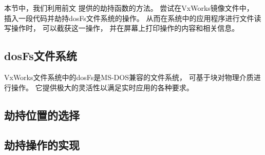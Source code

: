 本节中，我们利用前文
提供的劫持函数的方法。
尝试在VxWorks镜像文件中，
插入一段代码并劫持dosFs文件系统的操作。
从而在系统中的应用程序进行文件读写操作时，
可以截获这一操作，
并在屏幕上打印操作的内容和相关信息。

\subsection{dosFs文件系统}

VxWorks文件系统中的dosFs是MS-DOS兼容的文件系统，
可基于块对物理介质进行操作。
它提供极大的灵活性以满足实时应用的各种要求。

\subsection{劫持位置的选择}


\subsection{劫持操作的实现}






